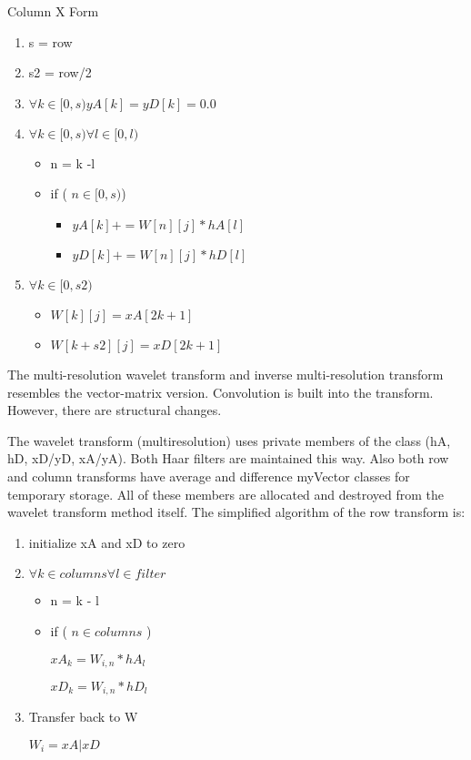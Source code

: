 \documentclass{article}
\begin{document}
Column X Form 

\begin{enumerate}
\item s = row
\item s2 = row/2
\item $\forall k \in [0,s) yA[k] = yD[k] = 0.0$
\item $\forall k \in [0,s) \forall l \in [0,l)$
\begin {itemize}
\item n = k -l
\item if ( $n \in [0,s)$) 
\begin{itemize}
\item $yA[k] += W[n][j] * hA[l]$
\item $yD[k] += W[n][j] * hD[l]$
\end {itemize}
\end {itemize}
\item $\forall k \in [0,s2) $
\begin{itemize}
\item $W[k][j] = xA[2k+1]$
\item $W[k+s2][j] = xD[2k+1]$
\end{itemize}
\end{enumerate}

The multi-resolution wavelet transform and inverse multi-resolution transform resembles the vector-matrix version.  Convolution is built into the transform.  However, there are structural changes.  

The wavelet transform (multiresolution) uses private members of the class (hA, hD, xD/yD, xA/yA).  Both Haar filters are maintained this way.  Also both row and column transforms have average and difference myVector classes for temporary storage.   All of these members are allocated and destroyed from the wavelet transform method itself.   The simplified algorithm of the row transform is:
\begin{enumerate}
\item initialize xA and xD to zero
\item $\forall k \in columns \forall l \in filter$
\begin{itemize}
\item n = k - l
\item if ( $n \in columns $ )

	$xA_k = W_{i,n} * hA_l $
	
	$xD_k = W_{i,n} * hD_l $
	
	
\end{itemize}
\item Transfer back to W

	$W_i = xA|xD $
\end{enumerate}
\end{document}
